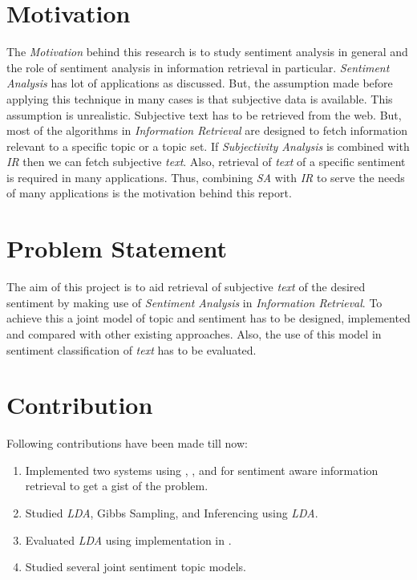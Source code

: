 \section{Motivation}
\par
The \textit{Motivation} behind this research is to study sentiment analysis in general and the role of sentiment analysis in information retrieval 
in particular. \textit{Sentiment Analysis} has lot of applications as discussed. But, the assumption made before applying this technique in
many cases is that subjective data is available. This assumption is unrealistic. Subjective text has to be retrieved from the web. But, most
of the algorithms in \textit{Information Retrieval} are designed to fetch information relevant to a specific topic or a topic set. If 
\textit{Subjectivity Analysis} is combined with \textit{IR} then we can fetch subjective \textit{text}. Also, retrieval of \textit{text} of 
a specific sentiment is required in many applications. Thus, combining \textit{SA} with \textit{IR} to serve the needs of many applications
is the motivation behind this report.


\section{Problem Statement}
\par
The aim of this project is to aid retrieval of subjective \textit{text} of the desired sentiment by making use of \textit{Sentiment Analysis}
in \textit{Information Retrieval}. To achieve this a joint model of topic and sentiment has to be designed, implemented and compared with
other existing approaches. Also, the use of this model in sentiment classification of \textit{text} has to be evaluated.

\section{Contribution}
\par
Following contributions have been made till now:
\begin{enumerate}
 \item Implemented two systems using \citep*{apachelucene}, \citep*{sentiwordnet}, and \citep*{stanfordpostagger} for sentiment aware information
 retrieval to get a gist of the problem.
 \item Studied \textit{LDA}, Gibbs Sampling, and Inferencing using \textit{LDA}.
 \item Evaluated \textit{LDA} using implementation in \citep*{mallet}.
 \item Studied several joint sentiment topic models.
\end{enumerate}

